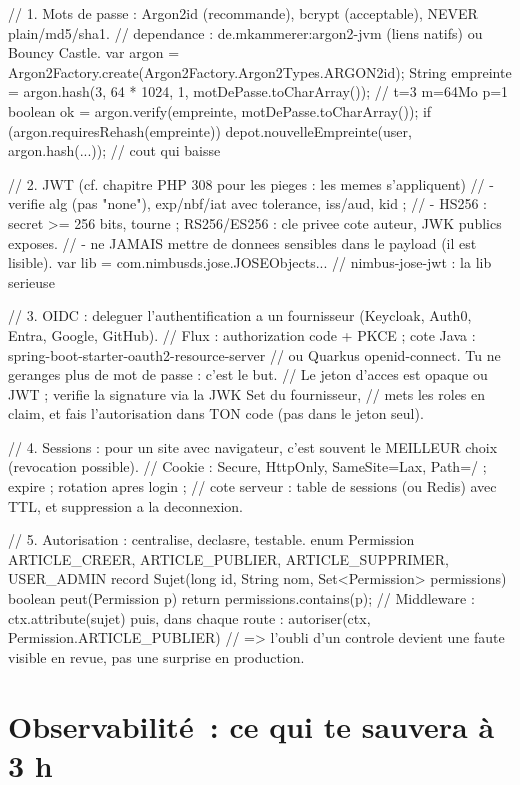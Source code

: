 \documentclass[12pt,a4paper,twoside,openright]{book}
\begin{document}
\begin{codejava}
// 1. Mots de passe : Argon2id (recommande), bcrypt (acceptable), NEVER plain/md5/sha1.
//    dependance : de.mkammerer:argon2-jvm (liens natifs) ou Bouncy Castle.
var argon = Argon2Factory.create(Argon2Factory.Argon2Types.ARGON2id);
String empreinte = argon.hash(3, 64 * 1024, 1, motDePasse.toCharArray());   // t=3 m=64Mo p=1
boolean ok = argon.verify(empreinte, motDePasse.toCharArray());
if (argon.requiresRehash(empreinte)) { depot.nouvelleEmpreinte(user, argon.hash(...)); }  // cout qui baisse

// 2. JWT (cf. chapitre PHP 308 pour les pieges : les memes s'appliquent)
//    - verifie alg (pas "none"), exp/nbf/iat avec tolerance, iss/aud, kid ;
//    - HS256 : secret >= 256 bits, tourne ; RS256/ES256 : cle privee cote auteur, JWK publics exposes.
//    - ne JAMAIS mettre de donnees sensibles dans le payload (il est lisible).
var lib = com.nimbusds.jose.JOSEObjects...       // nimbus-jose-jwt : la lib serieuse

// 3. OIDC : deleguer l'authentification a un fournisseur (Keycloak, Auth0, Entra, Google, GitHub).
//    Flux : authorization code + PKCE ; cote Java : spring-boot-starter-oauth2-resource-server
//    ou Quarkus openid-connect. Tu ne geranges plus de mot de passe : c'est le but.
//    Le jeton d'acces est opaque ou JWT ; verifie la signature via la JWK Set du fournisseur,
//    mets les roles en claim, et fais l'autorisation dans TON code (pas dans le jeton seul).

// 4. Sessions : pour un site avec navigateur, c'est souvent le MEILLEUR choix (revocation possible).
//    Cookie : Secure, HttpOnly, SameSite=Lax, Path=/ ; expire ; rotation apres login ;
//    cote serveur : table de sessions (ou Redis) avec TTL, et suppression a la deconnexion.

// 5. Autorisation : centralise, declasre, testable.
enum Permission { ARTICLE_CREER, ARTICLE_PUBLIER, ARTICLE_SUPPRIMER, USER_ADMIN }
record Sujet(long id, String nom, Set<Permission> permissions) {
    boolean peut(Permission p) { return permissions.contains(p); }
}
// Middleware : ctx.attribute(sujet) puis, dans chaque route : autoriser(ctx, Permission.ARTICLE_PUBLIER)
// => l'oubli d'un controle devient une faute visible en revue, pas une surprise en production.
\end{codejava}

\section{Observabilit\'e~: ce qui te sauvera \`a 3 h}
\end{document}

